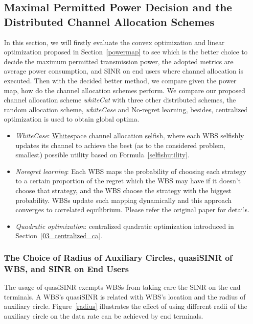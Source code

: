 \documentclass[times]{ettauth}
\theoremstyle{mytheoremstyle}
\theoremstyle{mytheoremstyle}
\theoremstyle{mytheoremstyle}
\begin{document}
\subsection{Maximal Permitted Power Decision and the Distributed Channel Allocation Schemes}
\label{MaxPower_whitecat}
In this section, we will firstly evaluate the convex optimization and linear optimization proposed in Section~\ref{powermap} to see which is the better choice to decide the maximum permitted transmission power, the adopted metrics are average power consumption, and SINR on end users where channel allocation is executed.
Then with the decided better method, we compare given the power map, how do the channel allocation schemes perform.
We compare our proposed channel allocation scheme \textit{whiteCat} with three other distributed schemes, the random allocation scheme, \textit{whiteCase} and No-regret learning, besides, centralized optimization is used to obtain global optima.

\begin{itemize}
\item \textit{WhiteCase}:  \underline{White}space \underline{c}hannel \underline{a}llocation \underline{se}lfish, where each WBS selfishly updates its channel to achieve the best (as to the considered problem, smallest) possible utility based on Formula~\ref{selfishutility}.

\item \textit{Noregret learning}: Each WBS maps the probability of choosing each strategy to a certain proportion of the regret which the WBS may have if it doesn't choose that strategy, and the WBS choose the strategy with the biggest probability.  
WBSs update such mapping dynamically and this approach converges to correlated equilibrium. 
Please refer the original paper \cite{hart00correlatedeq} for details.
		
\item \textit{Quadratic optimization}: centralized quadratic optimization introduced in Section~\ref{03_centralized_ca}.
\end{itemize}


\subsubsection*{The Choice of Radius of Auxiliary Circles, quasiSINR of WBS, and SINR on End Users}
The usage of quasiSINR exempts WBSs from taking care the SINR on the end terminals.
A WBS's quasiSINR is related with WBS's location and the radius of auxiliary circle.
Figure~\ref{radius} illustrates the effect of using different radii of the auxiliary circle on the data rate can be achieved by end terminals.
\end{document}
